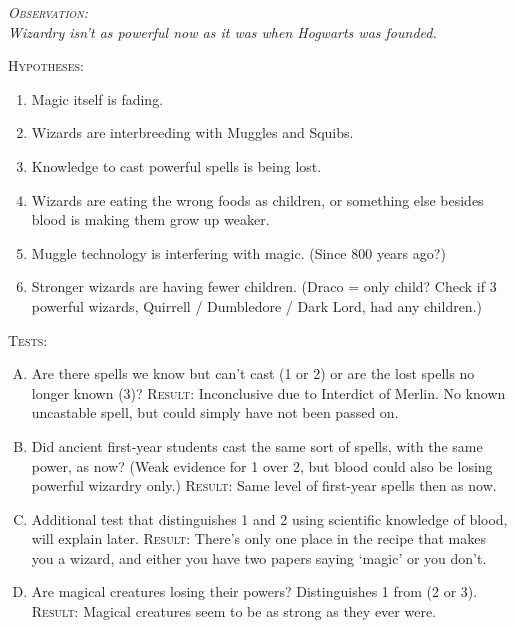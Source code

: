\begin{center}
\itshape
{\scshape Observation:}\\
Wizardry isn't as powerful now as it was when Hogwarts was founded.

\vspace{8.0pt plus 2.0pt minus 1.0pt}%

{\scshape Hypotheses:}
\begin{enumerate}[1.]
    \firmlist
    \item Magic itself is fading.
    \item Wizards are interbreeding with Muggles and Squibs.
    \item Knowledge to cast powerful spells is being lost.
    \item Wizards are eating the wrong foods as children, or something else besides blood is making them grow up weaker.
    \item Muggle technology is interfering with magic. (Since 800 years ago?)
    \item Stronger wizards are having fewer children. (Draco = only child? Check if 3 powerful wizards, Quirrell / Dumbledore / Dark Lord, had any children.)
\end{enumerate}

{\scshape Tests:}
\begin{enumerate}[A.]
    \firmlist
    \item Are there spells we know but can't cast (1 or 2) or are the lost spells no longer known (3)? {\scshape Result:} Inconclusive due to Interdict of Merlin. No known uncastable spell, but could simply have not been passed on.
    \item Did ancient first-year students cast the same sort of spells, with the same power, as now? (Weak evidence for 1 over 2, but blood could also be losing powerful wizardry only.) {\scshape Result:} Same level of first-year spells then as now.
    \item Additional test that distinguishes 1 and 2 using scientific knowledge of blood, will explain later. {\scshape Result:} There's only one place in the recipe that makes you a wizard, and either you have two papers saying `magic' or you don't.
    \item Are magical creatures losing their powers? Distinguishes 1 from (2 or 3). {\scshape Result:} Magical creatures seem to be as strong as they ever were.
\end{enumerate}
\end{center}

